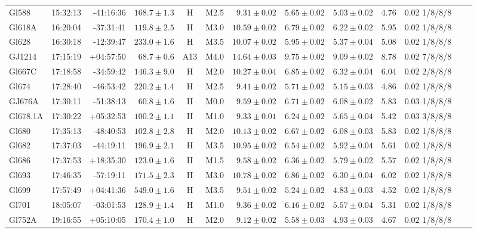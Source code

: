 \documentclass[referee]{aa}
\begin{document}
\begin{table}[h!]
{\begin{tabular}{ l r r r c c r r r r r r r}
Gl588 & 15:32:13 & -41:16:36 & $168.7 \pm  1.3$ & H & M2.5 &  $9.31 \pm 0.02$ & $5.65 \pm 0.02$ & $5.03 \pm 0.02$ & 4.76 & 0.02 1/8/8/8 \\
Gl618A & 16:20:04 & -37:31:41 & $119.8 \pm  2.5$ & H & M3.0 &  $10.59 \pm 0.02$ & $6.79 \pm 0.02$ & $6.22 \pm 0.02$ & 5.95 & 0.02 1/8/8/8 \\
Gl628 & 16:30:18 & -12:39:47 & $233.0 \pm  1.6$ & H & M3.5 &  $10.07 \pm 0.02$ & $5.95 \pm 0.02$ & $5.37 \pm 0.04$ & 5.08 & 0.02 1/8/8/8 \\
GJ1214 & 17:15:19 & +04:57:50 & $68.7 \pm  0.6$ & A13 & M4.0 &  $14.64 \pm 0.03$ & $9.75 \pm 0.02$ & $9.09 \pm 0.02$ & 8.78 & 0.02 7/8/8/8 \\
Gl667C & 17:18:58 & -34:59:42 & $146.3 \pm  9.0$ & H & M2.0 &  $10.27 \pm 0.04$ & $6.85 \pm 0.02$ & $6.32 \pm 0.04$ & 6.04 & 0.02 2/8/8/8 \\
Gl674 & 17:28:40 & -46:53:42 & $220.2 \pm  1.4$ & H & M2.5 &  $9.41 \pm 0.02$ & $5.71 \pm 0.02$ & $5.15 \pm 0.03$ & 4.86 & 0.02 1/8/8/8 \\
GJ676A & 17:30:11 & -51:38:13 & $60.8 \pm  1.6$ & H & M0.0 &  $9.59 \pm 0.02$ & $6.71 \pm 0.02$ & $6.08 \pm 0.02$ & 5.83 & 0.03 1/8/8/8 \\
Gl678.1A & 17:30:22 & +05:32:53 & $100.2 \pm  1.1$ & H & M1.0 &  $9.33 \pm 0.01$ & $6.24 \pm 0.02$ & $5.65 \pm 0.04$ & 5.42 & 0.03 3/8/8/8 \\
Gl680 & 17:35:13 & -48:40:53 & $102.8 \pm  2.8$ & H & M2.0 &  $10.13 \pm 0.02$ & $6.67 \pm 0.02$ & $6.08 \pm 0.03$ & 5.83 & 0.02 1/8/8/8 \\
Gl682 & 17:37:03 & -44:19:11 & $196.9 \pm  2.1$ & H & M3.5 &  $10.95 \pm 0.02$ & $6.54 \pm 0.02$ & $5.92 \pm 0.04$ & 5.61 & 0.02 1/8/8/8 \\
Gl686 & 17:37:53 & +18:35:30 & $123.0 \pm  1.6$ & H & M1.5 &  $9.58 \pm 0.02$ & $6.36 \pm 0.02$ & $5.79 \pm 0.02$ & 5.57 & 0.02 1/8/8/8 \\
Gl693 & 17:46:35 & -57:19:11 & $171.5 \pm  2.3$ & H & M3.0 &  $10.78 \pm 0.02$ & $6.86 \pm 0.02$ & $6.30 \pm 0.04$ & 6.02 & 0.02 1/8/8/8 \\
Gl699 & 17:57:49 & +04:41:36 & $549.0 \pm  1.6$ & H & M3.5 &  $9.51 \pm 0.02$ & $5.24 \pm 0.02$ & $4.83 \pm 0.03$ & 4.52 & 0.02 1/8/8/8 \\
Gl701 & 18:05:07 & -03:01:53 & $128.9 \pm  1.4$ & H & M1.0 &  $9.36 \pm 0.02$ & $6.16 \pm 0.02$ & $5.57 \pm 0.04$ & 5.31 & 0.02 1/8/8/8 \\
Gl752A & 19:16:55 & +05:10:05 & $170.4 \pm  1.0$ & H & M2.0 &  $9.12 \pm 0.02$ & $5.58 \pm 0.03$ & $4.93 \pm 0.03$ & 4.67 & 0.02 1/8/8/8 \\

\end{tabular}}
\end{table}
\end{document}

